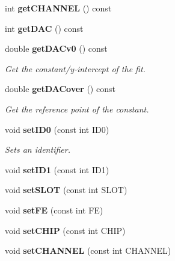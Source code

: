 \begin{DoxyCompactItemize}
\item 
int {\bfseries get\-C\-H\-A\-N\-N\-E\-L} () const \label{classCALICE_1_1ScECALMapping_ad711729998e617e9748d3b92a629fd4f}

\item 
int {\bfseries get\-D\-A\-C} () const \label{classCALICE_1_1ScECALMapping_a000df6f6ae36d1c01d34d61fd3eb0875}

\item 
double {\bf get\-D\-A\-Cv0} () const \label{classCALICE_1_1ScECALMapping_a9124cfbaa860f797b305dd68f6120efb}

\begin{DoxyCompactList}\small\item\em Get the constant/y-\/intercept of the fit. \end{DoxyCompactList}\item 
double {\bf get\-D\-A\-Cover} () const \label{classCALICE_1_1ScECALMapping_a06ff1a5f992e66625414d402f03701a3}

\begin{DoxyCompactList}\small\item\em Get the reference point of the constant. \end{DoxyCompactList}\item 
void {\bf set\-I\-D0} (const int I\-D0)\label{classCALICE_1_1ScECALMapping_a92e8ef73829de91a3eea0d28e7feba98}

\begin{DoxyCompactList}\small\item\em Sets an identifier. \end{DoxyCompactList}\item 
void {\bfseries set\-I\-D1} (const int I\-D1)\label{classCALICE_1_1ScECALMapping_ad15de16ad8eec86368a6056870cfd930}

\item 
void {\bfseries set\-S\-L\-O\-T} (const int S\-L\-O\-T)\label{classCALICE_1_1ScECALMapping_afba73e22a3fa004b69858b3da60ff982}

\item 
void {\bfseries set\-F\-E} (const int F\-E)\label{classCALICE_1_1ScECALMapping_abfd33cf61c46b9ebdf66b6af5e586508}

\item 
void {\bfseries set\-C\-H\-I\-P} (const int C\-H\-I\-P)\label{classCALICE_1_1ScECALMapping_af40ccfc4881e4b72aea5cccfaab951f6}

\item 
void {\bfseries set\-C\-H\-A\-N\-N\-E\-L} (const int C\-H\-A\-N\-N\-E\-L)\label{classCALICE_1_1ScECALMapping_adbc2b03d78b1418f77728837a94ded6b}


\end{DoxyCompactItemize}
